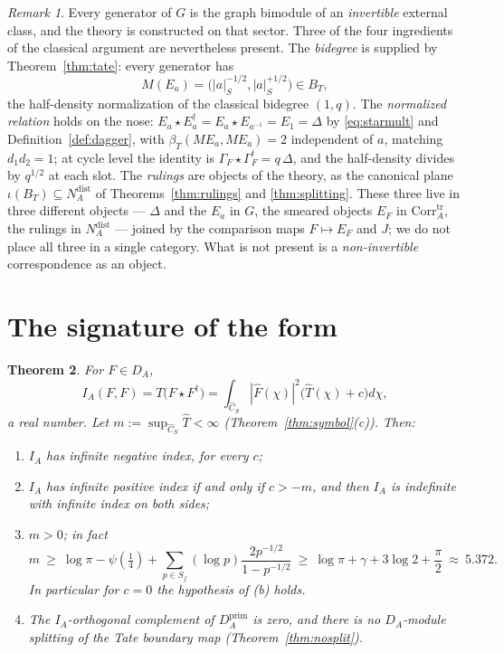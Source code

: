 \documentclass[11pt]{amsart}
\newtheorem{theorem}{Theorem}[section]
\theoremstyle{definition}
\theoremstyle{remark}
\newtheorem{remark}[theorem]{Remark}
\newcommand{\Th}{\widehat{T}}
\newcommand{\Ch}{\widehat{C}_S}
\newcommand{\DA}{D_A}
\newcommand{\Corrtr}{\mathrm{Corr}^{\mathrm{tr}}_{A}}
\newcommand{\BT}{B_T}
\newcommand{\NAd}{N_A^{\mathrm{dist}}}
\begin{document}
\begin{remark}\label{rem:invertible}
Every generator of $G$ is the graph bimodule of an \emph{invertible} external
class, and the theory is constructed on that sector.  Three of the four
ingredients of the classical argument are nevertheless present.  The
\emph{bidegree} is supplied by Theorem~\ref{thm:tate}: every generator has
\begin{equation}\label{eq:bidegree}
M(E_a)=\bigl(|a|_S^{-1/2},|a|_S^{+1/2}\bigr)\in\BT ,
\end{equation}
the half-density normalization of the classical bidegree $(1,q)$.  The
\emph{normalized relation} holds on the nose: $E_a\star E_a^{\dagger}=E_a\star
E_{a^{-1}}=E_1=\Delta$ by \eqref{eq:starmult} and Definition~\ref{def:dagger},
with $\beta_T(ME_a,ME_a)=2$ independent of $a$, matching $d_1d_2=1$; at cycle
level the identity is $\Gamma_F\star\Gamma_F^{t}=q\,\Delta$, and the
half-density divides by $q^{1/2}$ at each slot.  The \emph{rulings} are objects
of the theory, as the canonical plane $\iota(\BT)\subseteq\NAd$ of
Theorems~\ref{thm:rulings} and \ref{thm:splitting}.  These three live in three
different objects --- $\Delta$ and the $E_a$ in $G$, the smeared objects
$E_F$ in $\Corrtr$, the rulings in $\NAd$ --- joined by the comparison maps
$F\mapsto E_F$ and $J$; we do not place all three in a single category.  What is not present is a \emph{non-invertible} correspondence as an
object.
\end{remark}

\section{The signature of the form}\label{sec:signature}

\begin{theorem}\label{thm:signature}
For $F\in\DA$,
\begin{equation}\label{eq:IAF}
I_A(F,F)=T\bigl(F\star F^{\dagger}\bigr)
=\int_{\Ch}|\widehat F(\chi)|^{2}\bigl(\Th(\chi)+c\bigr)d\chi ,
\end{equation}
a real number.  Let $m:=\sup_{\Ch}\Th<\infty$
(Theorem~\ref{thm:symbol}(c)).  Then:
\begin{enumerate}
\item[(a)] $I_A$ has infinite negative index, for every $c$;
\item[(b)] $I_A$ has infinite positive index if and only if $c>-m$, and then
$I_A$ is indefinite with infinite index on both sides;
\item[(c)] $m>0$; in fact
\begin{equation}\label{eq:mbound}
m\ \ge\ \log\pi-\psi(\tfrac14)+\sum_{p\in S_f}(\log p)
\frac{2p^{-1/2}}{1-p^{-1/2}}\ \ge\ \log\pi+\gamma+3\log2+\frac{\pi}{2}
\ \approx\ 5.372 .
\end{equation}
In particular for $c=0$ the hypothesis of (b) holds.
\item[(d)] The $I_A$-orthogonal complement of $\DA^{\mathrm{prim}}$ is zero,
and there is no $\DA$-module splitting of the Tate boundary map
(Theorem~\ref{thm:nosplit}).
\end{enumerate}
\end{theorem}
\end{document}
